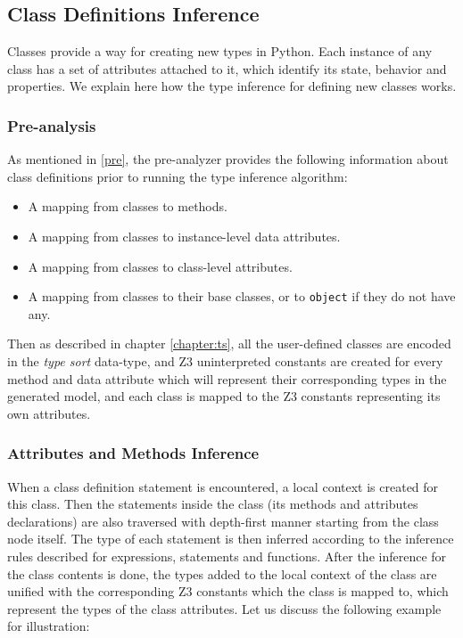 \subsection{Class Definitions Inference}
Classes provide a way for creating new types in Python. Each instance of any class has a set of attributes attached to it, which identify its state, behavior and properties. We explain here how the type inference for defining new classes works. \\

\subsubsection{Pre-analysis}
As mentioned in \ref{pre}, the pre-analyzer provides the following information about class definitions prior to running the type inference algorithm:

\begin{itemize}
	\item A mapping from classes to methods.
	\item A mapping from classes to instance-level data attributes.
	\item A mapping from classes to class-level attributes.
	\item A mapping from classes to their base classes, or to \lstinline|object| if they do not have any.
\end{itemize}

Then as described in chapter \ref{chapter:ts}, all the user-defined classes are encoded in the \textit{type sort} data-type, and Z3 uninterpreted constants are created for every method and data attribute which will represent their corresponding types in the generated model, and each class is mapped to the Z3 constants representing its own attributes.

\subsubsection{Attributes and Methods Inference}
When a class definition statement is encountered, a local context is created for this class. Then the statements inside the class (its methods and attributes declarations) are also traversed with depth-first manner starting from the class node itself. The type of each statement is then inferred according to the inference rules described for expressions, statements and functions. After the inference for the class contents is done, the types added to the local context of the class are unified with the corresponding Z3 constants which the class is mapped to, which represent the types of the class attributes. Let us discuss the following example for illustration:

